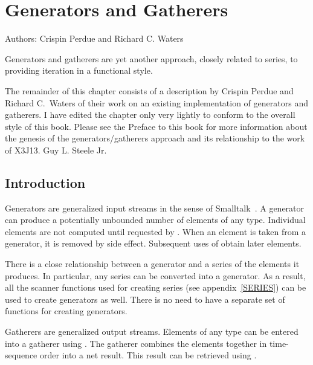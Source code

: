 

\clearpage\def\pagestatus{FINAL PROOF}

\chapter{Generators and Gatherers}
\label{GENERATORS}

Authors: Crispin Perdue and Richard C. Waters

\begin{new}
\prefaceword  Generators and gatherers are yet another
approach, closely related to series,
to providing iteration in a functional style.

The remainder of this chapter consists of a description by Crispin Perdue
and Richard C.~Waters of their work on an existing implementation of
generators and gatherers.  I have edited the chapter only very lightly to
conform to the overall style of this book.  Please see the Preface to this
book for more information about the genesis of the generators/gatherers
approach and its relationship to the work of X3J13. Guy L. Steele Jr.

\section{Introduction}

Generators are generalized input streams in the sense of
Smalltalk~\cite{SMALLTALK-80-BOOK}.  A generator can produce a potentially
unbounded number of elements of any type.  Individual elements are not
computed until requested by .  When an element is taken from
a generator, it is removed by side effect.  Subsequent uses of 
 obtain later elements.

There is a close relationship between a generator and a series of the
elements it produces.  In particular, any series can be converted into
a generator.  As a result, all the scanner functions used for
creating series (see appendix~\ref{SERIES}) can be used to create
generators as well.  There is no need to have a separate
set of functions for creating generators.

Gatherers are generalized output streams.  Elements of any type can be
entered into a gatherer using .  The gatherer combines the
elements together in time-sequence order into a net result.  This result can
be retrieved using .


\end{new}

